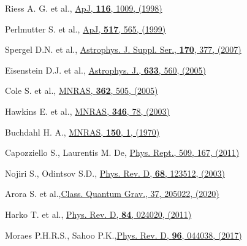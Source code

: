 

%


\begin{thebibliography}{99}

 Riess A. G. et al., \href{https://iopscience.iop.org/article/10.1086/300499}{ApJ, \textbf{116}, 1009, (1998)}

 Perlmutter  S. et al., \href{https://iopscience.iop.org/article/10.1086/307221}{ApJ, \textbf{517}, 565, (1999)}

 Spergel D.N. et al., \href{https://doi.org/10.1086/513700}{Astrophys. J. Suppl. Ser., \textbf{170}, 377, (2007)}

 Eisenstein D.J. et al., \href{https://doi.org/10.1086/466512}{Astrophys. J., \textbf{633}, 560, (2005)}

 Cole S. et al., \href{https://doi.org/10.1111/j.1365-2966.2005.09318.x}{MNRAS, \textbf{362}, 505, (2005)}

 Hawkins E. et al., \href{https://doi.org/10.1046/j.1365-2966.2003.07063.x}{MNRAS, \textbf{346}, 78, (2003)}


 Buchdahl  H. A., \href{https://ui.adsabs.harvard.edu/abs/1970MNRAS.150....1B}{MNRAS, \textbf{150}, 1, (1970)}

 Capozziello S., Laurentis M. De, \href{https://doi.org/10.1016/j.physrep.2011.09.003}{Phys. Rept., 509, 167, (2011)}


 Nojiri S., Odintsov S.D., \href{https://doi.org/10.1103/PhysRevD.68.123512}{Phys. Rev. D, \textbf{68}, 123512, (2003)}


 Arora S. et al.,\href{https://doi.org/10.1088/1361-6382/aba587}{Class. Quantum Grav., 37, 205022, (2020)}

 Harko T. et al., \href{https://doi.org/10.1103/PhysRevD.84.024020}{Phys. Rev. D, \textbf{84}, 024020, (2011)}

 Moraes P.H.R.S., Sahoo P.K.,\href{https://doi.org/10.1103/PhysRevD.96.044038}{Phys. Rev. D, \textbf{96}, 044038, (2017)}


\end{thebibliography}
